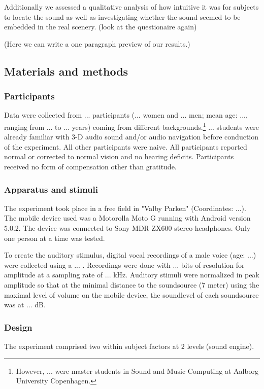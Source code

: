 \documentclass[journal]{IEEEtran}
\begin{document}
Additionally we assessed a qualitative analysis of how intuitive it was for subjects to locate the sound as well as investigating whether the sound seemed to be embedded in the real scenery. (look at the questionaire again)

(Here we can write a one paragraph preview of our results.)
\subsection{Materials and methods}
\subsubsection{Participants}
Data were collected from ... participants (... women and ... men; mean age: ..., ranging from ... to ... years) coming from different backgrounds.\footnote{However, ... were master students in Sound and Music Computing at Aalborg University Copenhagen.} ... students were already familiar with 3-D audio sound and/or audio navigation before conduction of the experiment. All other participants were naive. All participants reported normal or corrected to normal vision and no hearing deficits. Participants received no form of compensation other than gratitude. 

\subsubsection{Apparatus and stimuli}
The experiment took place in a free field in "Valby Parken" (Coordinates: ...). The mobile device used was a Motorolla Moto G running with Android version 5.0.2. The device was connected to Sony MDR ZX600 stereo headphones. Only one person at a time was tested. 

To create the auditory stimulus, digital vocal recordings of a male voice (age: ...) were collected using a ... . Recordings were done with ... bits of resolution for amplitude at a sampling rate of ...  kHz. Auditory stimuli were normalized in peak amplitude so that at the minimal distance to the soundsource (7 meter) using the maximal level of volume on the mobile device, the soundlevel of each soundsource was at ... dB. 

\subsubsection{Design}
The experiment comprised two within subject factors at 2 levels (sound engine).
\end{document}
